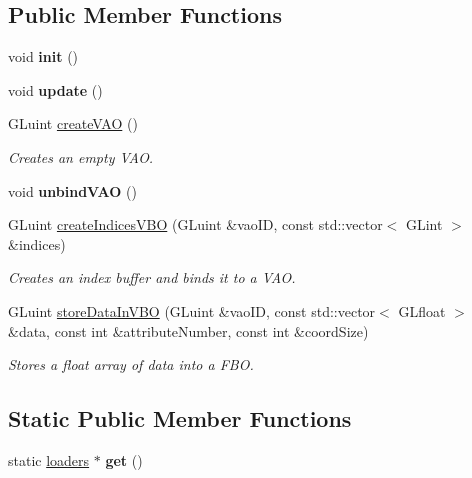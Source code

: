 \subsection*{Public Member Functions}
\begin{DoxyCompactItemize}
\item 
\mbox{\label{classflounder_1_1loaders_a6330a3de582baf8c55f5adc0c66cd503}} 
void {\bfseries init} ()
\item 
\mbox{\label{classflounder_1_1loaders_a74a01b7e9fe2c91750bfbe12a9be9671}} 
void {\bfseries update} ()
\item 
G\+Luint \hyperlink{classflounder_1_1loaders_a90123e47d1422f5e202a7ac439fee050}{create\+V\+AO} ()
\begin{DoxyCompactList}\small\item\em Creates an empty V\+AO. \end{DoxyCompactList}\item 
\mbox{\label{classflounder_1_1loaders_ad408dde74d3bcf097ce9dd97c29e7f12}} 
void {\bfseries unbind\+V\+AO} ()
\item 
G\+Luint \hyperlink{classflounder_1_1loaders_afcc6aaec9391699f25a014a7cd203592}{create\+Indices\+V\+BO} (G\+Luint \&vao\+ID, const std\+::vector$<$ G\+Lint $>$ \&indices)
\begin{DoxyCompactList}\small\item\em Creates an index buffer and binds it to a V\+AO. \end{DoxyCompactList}\item 
G\+Luint \hyperlink{classflounder_1_1loaders_a035a42c2f558c1f126cc54729388fca3}{store\+Data\+In\+V\+BO} (G\+Luint \&vao\+ID, const std\+::vector$<$ G\+Lfloat $>$ \&data, const int \&attribute\+Number, const int \&coord\+Size)
\begin{DoxyCompactList}\small\item\em Stores a float array of data into a F\+BO. \end{DoxyCompactList}\end{DoxyCompactItemize}
\subsection*{Static Public Member Functions}
\begin{DoxyCompactItemize}
\item 
\mbox{\label{classflounder_1_1loaders_ac57855261d2d43c545cac42e9efe981a}} 
static \hyperlink{classflounder_1_1loaders}{loaders} $\ast$ {\bfseries get} ()
\end{DoxyCompactItemize}
